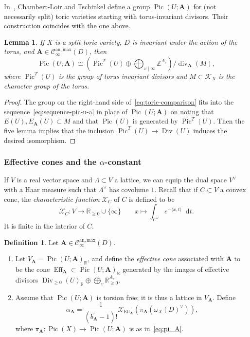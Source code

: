 \documentclass[a4paper, twoside, 10pt]{amsart}
\newcommand*\diff{\mathop{}\!\mathrm{d}}
\newcommand{\uA}{{\boldsymbol{A}}}
\newcommand{\cC}{\mathcal{C}}
\newcommand{\cK}{\mathcal{K}}
\newcommand{\charfun}{\mathcal{X}}
\newcommand{\RR}{\mathbb{R}}
\newcommand{\ZZ}{\mathbb{Z}}
\newcommand{\Canmax}{\cC^{\mathrm{an,max}}}
\DeclareMathOperator{\Div}{Div}
\DeclareMathOperator{\sdiv}{div}
\DeclareMathOperator{\Eff}{Eff}
\DeclareMathOperator{\Pic}{Pic}
\newtheorem{lemma}[theorem]{Lemma}
\theoremstyle{definition}
\newtheorem{definition}[theorem]{Definition}
\begin{document}
In~\cite{arXiv:1006.3345}, Chambert-Loir and Tschinkel define a group $\Pic(U;\uA)$ for (not necessarily split) toric varieties starting with torus-invariant divisors. Their construction coincides with the one above.

\begin{lemma}
  If $X$ is a split toric variety, $D$ is invariant under the action of the torus, and $\uA\in\Canmax_\infty(D)$, then 
  \begin{equation}\label{eq:toric-comparison}
    \Pic(U;\uA)
    \cong \left( \Pic^T(U) \oplus \bigoplus_{v\mid \infty} \ZZ^{A_v}\right)/\sdiv_\uA(M), 
  \end{equation}
  where $\Pic^T(U)$ is the group of torus invariant divisors and $M\subset \cK_X$ is the character group of the torus.
\end{lemma}
\begin{proof}
  The group on the right-hand side of~\eqref{eq:toric-comparison} fits into the sequence~\eqref{eq:sequence-pic-u-a} in place of $\Pic(U;\uA)$ on noting that $E(U), E_{\uA}(U)\subset M$ and that $\Pic(U)$ is generated by $\Pic^T(U)$.
  Then the five lemma implies that the inclusion $\Pic^T(U)\to \Div(U)$ induces the desired isomorphism.
\end{proof}


\subsubsection*{Effective cones and the $\alpha$-constant}

If $V$ is a real vector space and $\Lambda\subset V$ a lattice, 
we can equip the dual space $V^\vee$ with a Haar measure such that $\Lambda^\vee$ has covolume $1$.
Recall that if
$C\subset V$ a convex cone,
the \emph{characteristic function} $\charfun_{C}$ of $C$ is defined to be
\[
  \charfun_{C}\colon V\to \RR_{\ge 0}\cup\{\infty\} \qquad x\mapsto
  \int_{C^\vee} e^{-\langle x,t\rangle}\diff t.
\]
It is finite in the interior of $C$.

\begin{definition}\label{def:effective}
  Let $\uA\in \Canmax_\infty(D)$.
  \begin{enumerate}
    \item Let $V_\uA=\Pic(U;\uA)_\RR$, and define the \emph{effective cone} associated with $\uA$ to be the cone $\Eff_\uA\subset\Pic(U;\uA)_\RR$ generated by the images of effective divisors
    $\Div_{\ge 0}(U)_\RR\oplus\bigoplus_v\RR_{\ge 0}^{A_v}$. 
    \item\label{enum:alpha} Assume that $\Pic(U;\uA)$ is torsion free; it is thus a lattice in $V_\uA$. Define
    \[
      \alpha_{\uA}=\frac{1}{(b_\uA^\prime - 1)!}\charfun_{\Eff_\uA}(\pi_\uA (\omega_X(D)^\vee)),
    \]
    where $\pi_\uA\colon\Pic(X)\to\Pic(U;\uA)$ is as in~\eqref{eq:pi_A}.
  \end{enumerate}
\end{definition}
\end{document}
